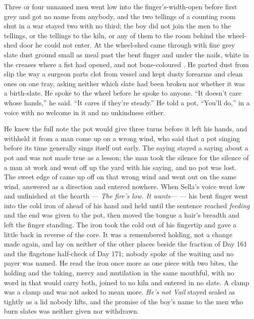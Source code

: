Three or four unnamed men went low into the finger's-width-open  before first grey and got no name from anybody, and the two tellings of a counting room shut in a war stayed two with no third; the boy did not join the men to the tellings, or the tellings to the kiln, or any of them to the room behind the wheel-shed door he could not enter. At the wheel-shed  came through with fine grey slate dust ground small as meal past the bent finger and under the nails, white in the creases where a fist had opened, and not bone-coloured . He parted dust from slip the way a surgeon parts clot from vessel and kept dusty forearms and clean ones on one tray, asking neither which slate had been broken nor whether it was a birth-slate. He spoke to the wheel before he spoke to anyone. “It doesn't care whose hands,” he said. “It cares if they're steady.” He told a pot, “You'll do,” in a voice with no welcome in it and no unkindness either.

He knew the full note the pot would give three turns before it left his hands, and withheld it from a man come up on a wrong wind, who said that a pot singing before its time generally sings itself out early. The saying stayed a saying about a pot and was not made true as a lesson; the man took the silence for the silence of a man at work and went off up the yard with his saying, and no pot was lost. The sweet edge of  came up off  on that wrong wind and went out on the same wind, answered as a direction and entered nowhere. When Sella's voice went low and unfinished at the hearth --- \emph{The fire's low. It wants---} --- his bent finger went into the cold iron of  ahead of his hand and held until the sentence reached \emph{feeding} and the end was given to the pot, then moved the tongue a hair's breadth and left the finger standing. The iron took the cold out of his fingertip and gave a little back in reverse of the core. It was a remembered holding, not a change made again, and lay on neither of the other places beside the fraction of Day 161 and the flagstone half-check of Day 171; nobody spoke of the waiting and no payer was named. He read the iron once more as one piece with two bites, the holding and the taking, mercy and mutilation in the same mouthful, with no word in  that would carry both, joined to no kiln and entered in no slate. A clamp was a clamp and was not asked to mean more. \emph{He's not Vail} stayed sealed as tightly as a lid nobody lifts, and the promise of the boy's name to the men who burn slates was neither given nor withdrawn.

